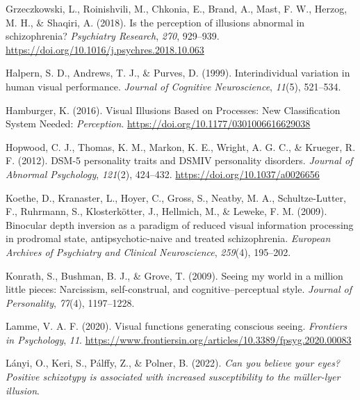 \documentclass[
  man,floatsintext]{apa6}
\newlength{\cslhangindent}
\newlength{\cslentryspacingunit} %
\newenvironment{CSLReferences}[2] %
 {%
  \setlength{\parindent}{0pt}
  \ifodd #1
  \let\oldpar\par
  \def\par{\hangindent=\cslhangindent\oldpar}
  \fi
  \setlength{\parskip}{#2\cslentryspacingunit}
 }%
 {}
\begin{document}
\begin{CSLReferences}{1}{0}
\leavevmode{}%
Grzeczkowski, L., Roinishvili, M., Chkonia, E., Brand, A., Mast, F. W., Herzog, M. H., \& Shaqiri, A. (2018). Is the perception of illusions abnormal in schizophrenia? \emph{Psychiatry Research}, \emph{270}, 929--939. \url{https://doi.org/10.1016/j.psychres.2018.10.063}

\leavevmode{}%
Halpern, S. D., Andrews, T. J., \& Purves, D. (1999). Interindividual variation in human visual performance. \emph{Journal of Cognitive Neuroscience}, \emph{11}(5), 521--534.

\leavevmode{}%
Hamburger, K. (2016). Visual Illusions Based on Processes: New Classification System Needed: \emph{Perception}. \url{https://doi.org/10.1177/0301006616629038}

\leavevmode{}%
Hopwood, C. J., Thomas, K. M., Markon, K. E., Wright, A. G. C., \& Krueger, R. F. (2012). DSM-5 personality traits and DSM{\textendash}IV personality disorders. \emph{Journal of Abnormal Psychology}, \emph{121}(2), 424--432. \url{https://doi.org/10.1037/a0026656}

\leavevmode{}%
Koethe, D., Kranaster, L., Hoyer, C., Gross, S., Neatby, M. A., Schultze-Lutter, F., Ruhrmann, S., Klosterkötter, J., Hellmich, M., \& Leweke, F. M. (2009). Binocular depth inversion as a paradigm of reduced visual information processing in prodromal state, antipsychotic-naive and treated schizophrenia. \emph{European Archives of Psychiatry and Clinical Neuroscience}, \emph{259}(4), 195--202.

\leavevmode{}%
Konrath, S., Bushman, B. J., \& Grove, T. (2009). Seeing my world in a million little pieces: Narcissism, self-construal, and cognitive--perceptual style. \emph{Journal of Personality}, \emph{77}(4), 1197--1228.

\leavevmode{}%
Lamme, V. A. F. (2020). Visual functions generating conscious seeing. \emph{Frontiers in Psychology}, \emph{11}. \url{https://www.frontiersin.org/articles/10.3389/fpsyg.2020.00083}

\leavevmode{}%
Lányi, O., Keri, S., Pálffy, Z., \& Polner, B. (2022). \emph{Can you believe your eyes? Positive schizotypy is associated with increased susceptibility to the m{ü}ller-lyer illusion}.


\end{CSLReferences}
\end{document}
